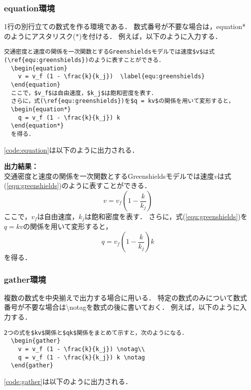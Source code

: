 \subsubsection{equation環境}

1行の別行立ての数式を作る環境である．
数式番号が不要な場合は，equation*のようにアスタリスク($\ast$)を付ける．
例えば，以下のように入力する．
\begin{lstlisting}[caption=equation環境,label=code:equation]
  交通密度と速度の関係を一次関数とするGreenshieldsモデルでは速度$v$は式(\ref{equ:greenshields})のように表すことができる．
  \begin{equation}
    v = v_f (1 - \frac{k}{k_j})  \label{equ:greenshields}
  \end{equation}
  ここで，$v_f$は自由速度，$k_j$は飽和密度を表す．
  さらに，式(\ref{equ:greenshields})を$q = kv$の関係を用いて変形すると，
  \begin{equation*}
    q = v_f (1 - \frac{k}{k_j}) k 
  \end{equation*}
  を得る．
\end{lstlisting}
\code\ref{code:equation}は以下のように出力される．

\noindent\textbf{出力結果：}\hrulefill\\
  交通密度と速度の関係を一次関数とするGreenshieldsモデルでは速度$v$は式(\ref{equ:greenshields})のように表すことができる．
  \begin{equation}
    v = v_f (1 - \frac{k}{k_j})  \label{equ:greenshields}
  \end{equation}
  ここで，$v_f$は自由速度，$k_j$は飽和密度を表す．
  さらに，式(\ref{equ:greenshields})を$q = kv$の関係を用いて変形すると，
  \begin{equation*}
    q = v_f (1 - \frac{k}{k_j}) k 
  \end{equation*}
  を得る．
\\\noindent\hrulefill 

\subsubsection{gather環境}

複数の数式を中央揃えで出力する場合に用いる．
特定の数式のみについて数式番号が不要な場合は\textbackslash notagを数式の後に書いておく．
例えば，以下のように入力する．
\begin{lstlisting}[caption=gather環境,label=code:gather]
  2つの式を$kv$関係と$qk$関係をまとめて示すと，次のようになる．
  \begin{gather}
    v = v_f (1 - \frac{k}{k_j}) \notag\\
    q = v_f (1 - \frac{k}{k_j}) k \notag
  \end{gather}
\end{lstlisting}
\code\ref{code:gather}は以下のように出力される．

